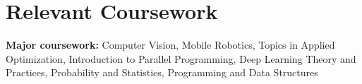 \documentclass[letterpaper,11pt]{article}
\makeatletter
\newcommand{\resumeOrganizationHeading}[4]{
	\vspace{-2pt}\item
		\begin{tabular*}{0.97\textwidth}[t]{l@{\extracolsep{\fill}}r}
			\textbf{#1} & \textit{\small #2} \\
			\textit{\small#3}
		\end{tabular*}\vspace{-7pt}
}
\newcommand{\resumeSubHeadingListStart}{\begin{itemize}[leftmargin=0.15in, label={}]}
\newcommand{\resumeSubHeadingListEnd}{\end{itemize}}
\makeatother
\begin{document}

\section{Relevant Coursework}
	\vspace{2pt}
	\resumeSubHeadingListStart
		\small{\item{
				\textbf{Major coursework:}{ Computer Vision, Mobile Robotics, Topics in Applied Optimization, Introduction to Parallel Programming, Deep Learning Theory and Practices, Probability and Statistics, 
				Programming and Data Structures} \\ \vspace{3pt}
				
		}}
	\resumeSubHeadingListEnd





		
		




		
		








		



\end{document}
